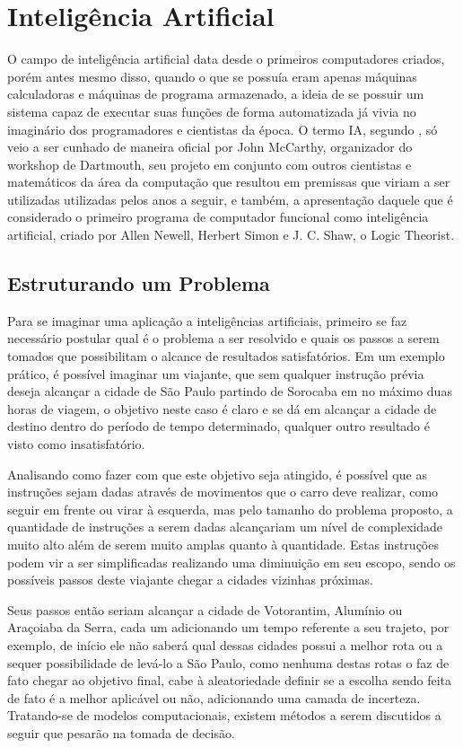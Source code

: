 \chapter{Intelig{\^e}ncia Artificial}

O campo de inteligência artificial data desde o primeiros computadores
criados, porém antes mesmo disso, quando o que se possuía eram apenas
máquinas calculadoras e máquinas de programa armazenado, a ideia de se
possuir um sistema capaz de executar suas funções de forma
automatizada já vivia no imaginário dos programadores e cientistas da
época. O termo IA, segundo , só veio a ser
cunhado de maneira oficial por John McCarthy, organizador do workshop
de Dartmouth, seu projeto em conjunto com outros cientistas e
matemáticos da área da computação que resultou em premissas que viriam
a ser utilizadas utilizadas pelos anos a seguir, e também, a
apresentação daquele que é considerado o primeiro programa de
computador funcional como inteligência artificial, criado por Allen
Newell, Herbert Simon e J. C. Shaw, o Logic Theorist.

\section{Estruturando um Problema}

Para se imaginar uma aplicação a inteligências artificiais, primeiro
se faz necessário postular qual é o problema a ser resolvido e quais
os passos a serem tomados que possibilitam o alcance de resultados
satisfatórios. Em um exemplo prático, é possível imaginar um viajante,
que sem qualquer instrução prévia deseja alcançar a cidade de São
Paulo partindo de Sorocaba em no máximo duas horas de viagem, o
objetivo neste caso é claro e se dá em alcançar a cidade de destino
dentro do período de tempo determinado, qualquer outro resultado é
visto como insatisfatório.

Analisando como fazer com que este objetivo seja atingido, é possível
que as instruções sejam dadas através de movimentos que o carro deve
realizar, como seguir em frente ou virar à esquerda, mas pelo tamanho
do problema proposto, a quantidade de instruções a serem dadas
alcançariam um nível de complexidade muito alto além de serem muito
amplas quanto à quantidade. Estas instruções podem vir a ser
simplificadas realizando uma diminuição em seu escopo, sendo os
possíveis passos deste viajante chegar a cidades vizinhas próximas.

Seus passos então seriam alcançar a cidade de Votorantim, Alumínio ou
Araçoiaba da Serra, cada um adicionando um tempo referente a seu
trajeto, por exemplo, de início ele não saberá qual dessas cidades
possui a melhor rota ou a sequer possibilidade de levá-lo a São Paulo,
como nenhuma destas rotas o faz de fato chegar ao objetivo final, cabe
à aleatoriedade definir se a escolha sendo feita de fato é a melhor
aplicável ou não, adicionando uma camada de incerteza. Tratando-se de
modelos computacionais, existem métodos a serem discutidos a seguir
que pesarão na tomada de decisão.

